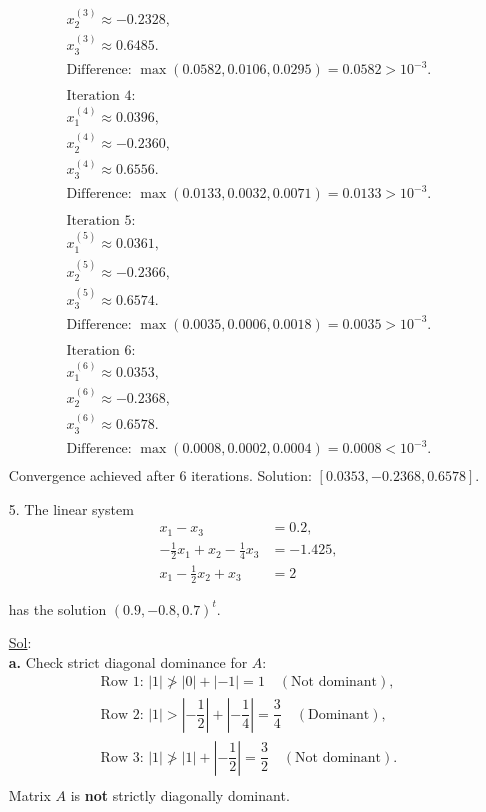 \begin{enumerate}
\[\begin{array}{l}
        x_2^{(3)} \approx -0.2328, \\
        x_3^{(3)} \approx 0.6485. \\
        \text{Difference: } \max(0.0582, 0.0106, 0.0295) = 0.0582 > 10^{-3}. \\
        \\
        \text{Iteration 4:} \\
        x_1^{(4)} \approx 0.0396, \\
        x_2^{(4)} \approx -0.2360, \\
        x_3^{(4)} \approx 0.6556. \\
        \text{Difference: } \max(0.0133, 0.0032, 0.0071) = 0.0133 > 10^{-3}. \\
        \\
        \text{Iteration 5:} \\
        x_1^{(5)} \approx 0.0361, \\
        x_2^{(5)} \approx -0.2366, \\
        x_3^{(5)} \approx 0.6574. \\
        \text{Difference: } \max(0.0035, 0.0006, 0.0018) = 0.0035 > 10^{-3}. \\
        \\
        \text{Iteration 6:} \\
        x_1^{(6)} \approx 0.0353, \\
        x_2^{(6)} \approx -0.2368, \\
        x_3^{(6)} \approx 0.6578. \\
        \text{Difference: } \max(0.0008, 0.0002, 0.0004) = 0.0008 < 10^{-3}. \\
      \end{array}
    \]
    Convergence achieved after 6 iterations. Solution:
    \(\boxed{[0.0353, -0.2368, 0.6578]}\).

  \item[5.] The linear system
    \[
      \begin{aligned}
        x_1 - x_3 &= 0.2, \\
        - \frac{1}{2} x_1 + x_2 - \frac{1}{4} x_3 &= -1.425, \\
        x_1 - \frac{1}{2} x_2 + x_3 &= 2
      \end{aligned}
    \]

    has the solution \((0.9, -0.8, 0.7)^t\).

    \underline{Sol}:\\
    \textbf{a.} Check strict diagonal dominance for \(A\):
    \[
      \begin{array}{l}
        \text{Row 1: } |1| \not> |0| + |-1| =1 \quad (\text{Not dominant}), \\
        \text{Row 2: } |1| > \left|-\dfrac{1}{2}\right| +
        \left|-\dfrac{1}{4}\right| = \dfrac{3}{4} \quad (\text{Dominant}), \\
        \text{Row 3: } |1| \not> |1| + \left|-\dfrac{1}{2}\right| =
        \dfrac{3}{2} \quad (\text{Not dominant}). \\
      \end{array}
    \]
    Matrix \(A\) is \textbf{not} strictly diagonally dominant.


\end{enumerate}
